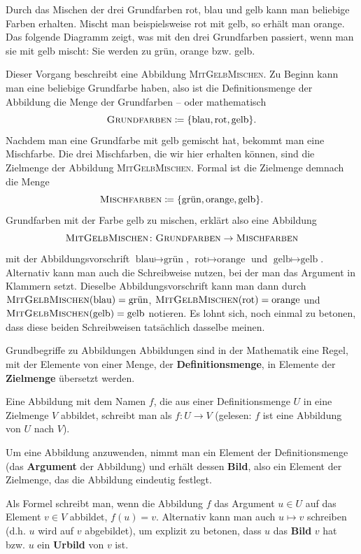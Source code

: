 \documentclass[../../main.tex]{subfiles}
\begin{document}
\begin{example}{}
    Durch das Mischen der drei Grundfarben rot, blau und gelb kann man beliebige Farben erhalten. Mischt man beispielsweise rot mit gelb, so erhält man orange. Das folgende Diagramm zeigt, was mit den drei Grundfarben passiert, wenn man sie mit gelb mischt: Sie werden zu grün, orange bzw. gelb.
    \begin{center}
    \end{center}
    Dieser Vorgang beschreibt eine Abbildung \textsc{MitGelbMischen}. Zu Beginn kann man eine beliebige Grundfarbe haben, also ist die Definitionsmenge der Abbildung die Menge der Grundfarben -- oder mathematisch \[\textsc{Grundfarben}\coloneqq\{\text{blau},\text{rot},\text{gelb}\}.\]
    Nachdem man eine Grundfarbe mit gelb gemischt hat, bekommt man eine Mischfarbe. Die drei Mischfarben, die wir hier erhalten können, sind die Zielmenge der Abbildung \textsc{MitGelbMischen}. Formal ist die Zielmenge demnach die Menge \[\textsc{Mischfarben}\coloneqq\{\text{grün},\text{orange},\text{gelb}\}.\]
    Grundfarben mit der Farbe gelb zu mischen, erklärt also eine Abbildung \[\textsc{MitGelbMischen}\colon\textsc{Grundfarben}\rightarrow\textsc{Mischfarben}\] mit der Abbildungsvorschrift $\text{blau}\mapsto\text{grün}$, $\text{rot}\mapsto\text{orange}$ und $\text{gelb}\mapsto\text{gelb}$. Alternativ kann man auch die Schreibweise nutzen, bei der man das Argument in Klammern setzt. Dieselbe Abbildungsvorschrift kann man dann durch $\textsc{MitGelbMischen}(\text{blau})=\text{grün}$, $\textsc{MitGelbMischen}(\text{rot})=\text{orange}$ und $\textsc{MitGelbMischen}(\text{gelb})=\text{gelb}$ notieren. Es lohnt sich, noch einmal zu betonen, dass diese beiden Schreibweisen tatsächlich dasselbe meinen.
\end{example}

\begin{nutshell}{Grundbegriffe zu Abbildungen}
    \parpic[r]{
    }
    Abbildungen sind in der Mathematik eine Regel, mit der Elemente von einer Menge, der \textbf{Definitionsmenge}, in Elemente der \textbf{Zielmenge} übersetzt werden.
    
    Eine Abbildung mit dem Namen $f$, die aus einer Definitionsmenge $U$ in eine Zielmenge $V$ abbildet, schreibt man als $f\colon U\rightarrow V$ (gelesen: $f$ ist eine Abbildung von $U$ nach $V$).
    
    Um eine Abbildung anzuwenden, nimmt man ein Element der Definitionsmenge (das \textbf{Argument} der Abbildung) und erhält dessen \textbf{Bild}, also ein Element der Zielmenge, das die Abbildung eindeutig festlegt. 
    
    Als Formel schreibt man, wenn die Abbildung $f$ das Argument $u\in U$ auf das Element $v\in V$ abbildet, $f(u)=v$. Alternativ kann man auch $u\mapsto v$ schreiben (d.h. $u$ wird auf $v$ abgebildet), um explizit zu betonen, dass $u$ das \textbf{Bild} $v$ hat bzw. $u$ ein \textbf{Urbild} von $v$ ist.
\end{nutshell}
\end{document}
